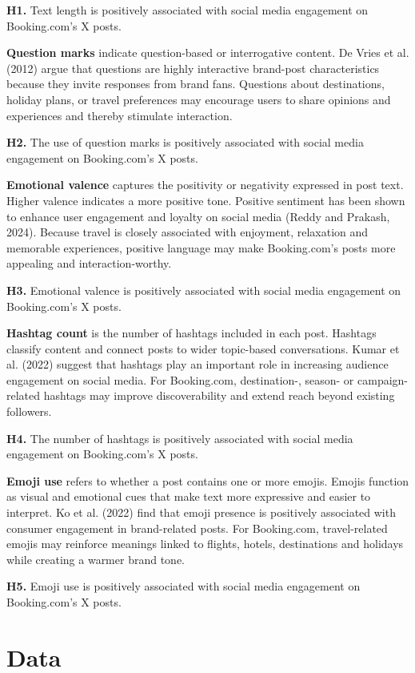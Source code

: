 \documentclass[12pt,a4paper]{article}
\begin{document}
\textbf{H1.} Text length is positively associated with social media engagement on Booking.com's X posts.

\textbf{Question marks} indicate question-based or interrogative content. De Vries et al. (2012) argue that questions are highly interactive brand-post characteristics because they invite responses from brand fans. Questions about destinations, holiday plans, or travel preferences may encourage users to share opinions and experiences and thereby stimulate interaction.

\textbf{H2.} The use of question marks is positively associated with social media engagement on Booking.com's X posts.

\textbf{Emotional valence} captures the positivity or negativity expressed in post text. Higher valence indicates a more positive tone. Positive sentiment has been shown to enhance user engagement and loyalty on social media (Reddy and Prakash, 2024). Because travel is closely associated with enjoyment, relaxation and memorable experiences, positive language may make Booking.com's posts more appealing and interaction-worthy.

\textbf{H3.} Emotional valence is positively associated with social media engagement on Booking.com's X posts.

\textbf{Hashtag count} is the number of hashtags included in each post. Hashtags classify content and connect posts to wider topic-based conversations. Kumar et al. (2022) suggest that hashtags play an important role in increasing audience engagement on social media. For Booking.com, destination-, season- or campaign-related hashtags may improve discoverability and extend reach beyond existing followers.

\textbf{H4.} The number of hashtags is positively associated with social media engagement on Booking.com's X posts.

\textbf{Emoji use} refers to whether a post contains one or more emojis. Emojis function as visual and emotional cues that make text more expressive and easier to interpret. Ko et al. (2022) find that emoji presence is positively associated with consumer engagement in brand-related posts. For Booking.com, travel-related emojis may reinforce meanings linked to flights, hotels, destinations and holidays while creating a warmer brand tone.

\textbf{H5.} Emoji use is positively associated with social media engagement on Booking.com's X posts.

\section{Data}
\end{document}
